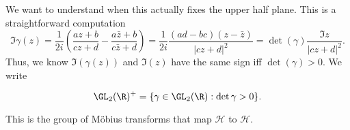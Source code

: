 \documentclass[a4paper]{article}
\renewcommand{\H}{\mathcal{H}}
\begin{document}
We want to understand when this actually fixes the upper half plane. This is a straightforward computation
\[
  \Im \gamma(z) = \frac{1}{2i} \left(\frac{az + b}{cz + d} - \frac{a\bar{z} + b}{c \bar{z} + d}\right) = \frac{1}{2i} \frac{(ad - bc) (z - \bar{z})}{|cz + d|^2} = \det(\gamma) \frac{\Im z}{ |cz + d|^2}.
\]
%
Thus, we know $\Im(\gamma(z))$ and $\Im(z)$ have the same sign iff $\det(\gamma) > 0$. We write
\begin{defi}[$\GL_2(\R)^+$]
  \[
    \GL_2(\R)^+ = \{\gamma \in \GL_2(\R) : \det \gamma > 0\}.
  \]
\end{defi}
This is the group of M\"obius transforms that map $\H$ to $\H$.
\end{document}
